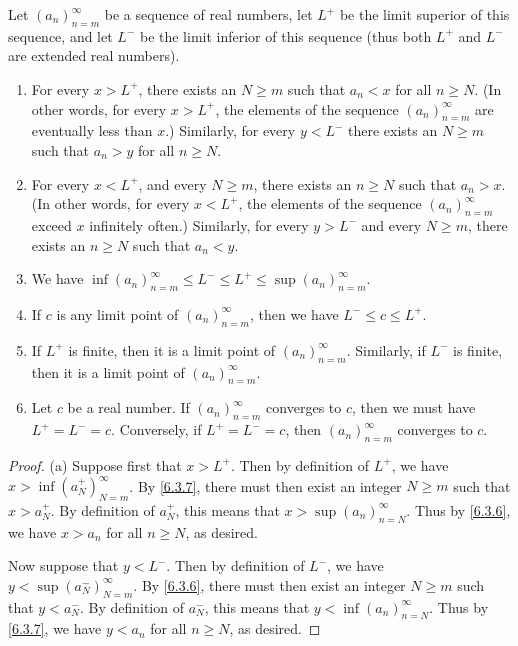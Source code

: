 \begin{prop}\label{6.4.12}
  Let \((a_n)_{n = m}^\infty\) be a sequence of real numbers, let \(L^+\) be the limit superior of this sequence, and let \(L^-\) be the limit inferior of this sequence
  (thus both \(L^+\) and \(L^-\) are extended real numbers).
  \begin{enumerate}
    \item For every \(x > L^+\), there exists an \(N \geq m\) such that \(a_n < x\) for all \(n \geq N\).
          (In other words, for every \(x > L^+\), the elements of the sequence \((a_n)_{n = m}^\infty\) are eventually less than \(x\).)
          Similarly, for every \(y < L^-\) there exists an \(N \geq m\) such that \(a_n > y\) for all \(n \geq N\).
    \item For every \(x < L^+\), and every \(N \geq m\), there exists an \(n \geq N\) such that \(a_n > x\).
          (In other words, for every \(x < L^+\), the elements of the sequence \((a_n)_{n = m}^\infty\) exceed \(x\) infinitely often.)
          Similarly, for every \(y > L^-\) and every \(N \geq m\), there exists an \(n \geq N\) such that \(a_n < y\).
    \item We have \(\inf(a_n)_{n = m}^\infty \leq L^- \leq L^+ \leq \sup(a_n)_{n = m}^\infty\).
    \item If \(c\) is any limit point of \((a_n)_{n = m}^\infty\), then we have \(L^- \leq c \leq L^+\).
    \item If \(L^+\) is finite, then it is a limit point of \((a_n)_{n = m}^\infty\).
          Similarly, if \(L^-\) is finite, then it is a limit point of \((a_n)_{n = m}^\infty\).
    \item Let \(c\) be a real number.
          If \((a_n)_{n = m}^\infty\) converges to \(c\), then we must have \(L^+ = L^- = c\).
          Conversely, if \(L^+ = L^- = c\), then \((a_n)_{n = m}^\infty\) converges to \(c\).
  \end{enumerate}
\end{prop}

\begin{proof}{(a)}
  Suppose first that \(x > L^+\).
  Then by definition of \(L^+\), we have \(x > \inf(a_N^+)_{N = m}^\infty\).
  By \cref{6.3.7}, there must then exist an integer \(N \geq m\) such that \(x > a_N^+\).
  By definition of \(a_N^+\), this means that \(x > \sup(a_n)_{n = N}^\infty\).
  Thus by \cref{6.3.6}, we have \(x > a_n\) for all \(n \geq N\), as desired.

  Now suppose that \(y < L^-\).
  Then by definition of \(L^-\), we have \(y < \sup(a_N^-)_{N = m}^\infty\).
  By \cref{6.3.6}, there must then exist an integer \(N \geq m\) such that \(y < a_N^-\).
  By definition of \(a_N^-\), this means that \(y < \inf(a_n)_{n = N}^\infty\).
  Thus by \cref{6.3.7}, we have \(y < a_n\) for all \(n \geq N\), as desired.
\end{proof}

